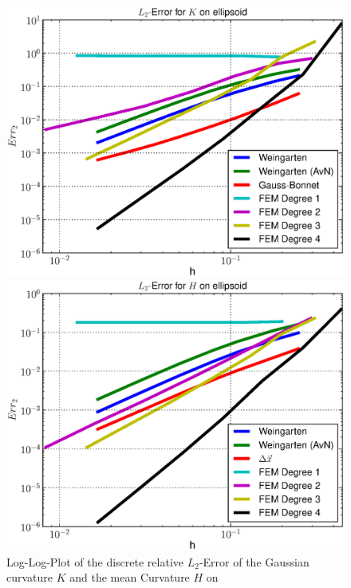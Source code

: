 \documentclass[a2paper]{scrartcl}
\begin{document}
\begin{figure}[h!]
\begin{minipage}[t]{0.24\textwidth}
    \end{minipage}\hfill
    \begin{minipage}[t]{0.24\textwidth}
       \centering\includegraphics[width=\textwidth]{bilder/heineC/ErrKL2.eps}
    \end{minipage}\hfill
    \begin{minipage}[t]{0.24\textwidth}
       \centering\includegraphics[width=\textwidth]{bilder/heineC/ErrHL2.eps}
    \end{minipage}
    \caption[Fehlerplot (Krümmungen auf Sphäre)]
            {Log-Log-Plot of the discrete relative \( L_{2} \)-Error of the Gaussian curvature \( K \) and the mean Curvature \( H \) on
}
\end{figure}
\end{document}
